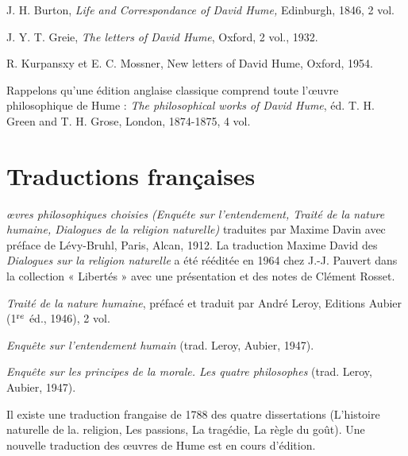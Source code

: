 J. H. Burton, {\it Life and Correspondance of David Hume,}
Edinburgh, 1846, 2 vol.

J. Y. T. Greie, {\it The letters of David Hume}, Oxford, 2 vol.,
1932.

{\it }R. Kurpansxy et E. C. Mossner, New letters of David
Hume, Oxford, 1954.

Rappelons qu’une édition anglaise classique comprend
toute l’{\oe}uvre philosophique de Hume : {\it The philosophical
works of David Hume}, éd. T. H. Green and T. H. Grose,
London, 1874-1875, 4 vol.

\section{Traductions françaises}

{\it {\oe}vres philosophiques choisies (Enquéte sur l'entendement,
Traité de la nature humaine, Dialogues de la religion
naturelle)}  traduites par Maxime Davin avec préface
de Lévy-Bruhl, Paris, Alcan, 1912. La traduction
Maxime David des {\it Dialogues sur la religion naturelle}
a été rééditée en 1964 chez J.-J. Pauvert dans la collection 
« Libertés » avec une présentation et des notes
de Clément Rosset.

{\it Traité de la nature humaine}, préfacé et traduit par André
Leroy, Editions Aubier (1$^{\text re}$ éd., 1946), 2 vol.

{\it Enquête sur l'entendement humain} (trad. Leroy, Aubier,
1947).

{\it Enquête sur les principes de la morale. Les quatre philosophes} 
(trad. Leroy, Aubier, 1947).

Il existe une traduction frangaise de 1788 des quatre
dissertations (L’histoire naturelle de la. religion, Les passions, 
La tragédie, La règle du goût). Une nouvelle traduction 
des {\oe}uvres de Hume est en cours d’édition.

 

 
